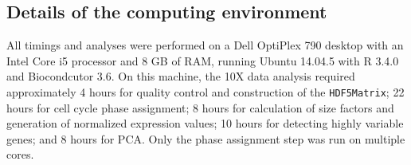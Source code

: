 \documentclass[10pt,letterpaper]{article}
\newcommand{\code}[1]{\texttt{#1}}
\begin{document}
\subsection*{Details of the computing environment}
All timings and analyses were performed on a Dell OptiPlex 790 desktop with an Intel Core i5 processor and 8 GB of RAM, running Ubuntu 14.04.5 with R 3.4.0 and Biocondcutor 3.6.
On this machine, the 10X data analysis required approximately 4 hours for quality control and construction of the \code{HDF5Matrix};
22 hours for cell cycle phase assignment;
8 hours for calculation of size factors and generation of normalized expression values;
10 hours for detecting highly variable genes;
and 8 hours for PCA.
Only the phase assignment step was run on multiple cores.


{\small
    
    
}
\end{document}
